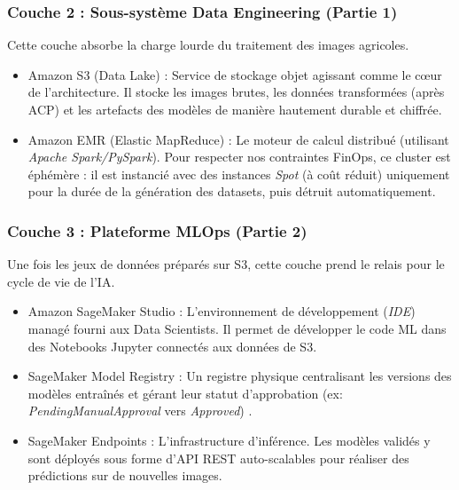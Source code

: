 \subsubsection{Couche 2 : Sous-système Data Engineering (Partie 1)}
Cette couche absorbe la charge lourde du traitement des images agricoles.
\begin{itemize}
    \item[$\bullet$] Amazon S3 (Data Lake) : Service de stockage objet agissant comme le cœur de l'architecture. Il stocke les images brutes, les données transformées (après ACP) et les artefacts des modèles de manière hautement durable et chiffrée.
    \item[$\bullet$] Amazon EMR (Elastic MapReduce) : Le moteur de calcul distribué (utilisant \textit{Apache Spark/PySpark}). Pour respecter nos contraintes FinOps, ce cluster est éphémère : il est instancié avec des instances \textit{Spot} (à coût réduit) uniquement pour la durée de la génération des datasets, puis détruit automatiquement.
\end{itemize}

\subsubsection{Couche 3 : Plateforme MLOps (Partie 2)}
Une fois les jeux de données préparés sur S3, cette couche prend le relais pour le cycle de vie de l'IA.
\begin{itemize}
    \item[$\bullet$] Amazon SageMaker Studio : L'environnement de développement (\textit{IDE}) managé fourni aux Data Scientists. Il permet de développer le code ML dans des Notebooks Jupyter connectés aux données de S3.
    \item[$\bullet$] SageMaker Model Registry : Un registre physique centralisant les versions des modèles entraînés et gérant leur statut d'approbation (ex: \textit{PendingManualApproval} vers \textit{Approved}) \cite{43}.
    \item[$\bullet$] SageMaker Endpoints : L'infrastructure d'inférence. Les modèles validés y sont déployés sous forme d'API REST auto-scalables pour réaliser des prédictions sur de nouvelles images.
\end{itemize}


